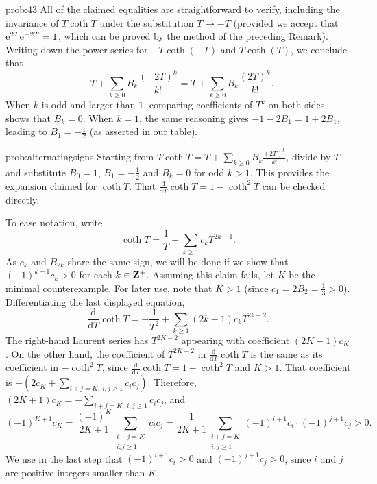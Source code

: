 \begin{sol}{prob:43} All of the claimed equalities are straightforward to verify, including the invariance of $T\coth{T}$ under the substitution $T\mapsto -T$ (provided we accept that $\mathrm{e}^{2T} \mathrm{e}^{-2T}=1$, which can be proved by the method of the preceding Remark). Writing down the power series for $-T\coth(-T)$ and $T\coth(T)$, we conclude that
\[ -T + \sum_{k\ge 0} B_k \frac{(-2T)^{k}}{k!} = T + \sum_{k\ge 0} B_k \frac{(2T)^{k}}{k!}. \]
When $k$ is odd and larger than $1$, comparing coefficients of $T^k$ on both sides shows that $B_k=0$. When $k=1$, the same reasoning gives $-1 -2B_1 = 1 + 2B_1$, leading to $B_1 = -\frac{1}{2}$ (as asserted in our table).

\begin{sol}{prob:alternatingsigns} Starting from $T\coth{T} = T + \sum_{k\ge 0} B_k \frac{(2T)^{k}}{k!}$, divide by $T$ and substitute $B_0=1$, $B_1=-\frac{1}{2}$ and $B_k=0$ for odd $k>1$. This provides the expansion claimed for $\coth{T}$. That $\frac{\mathrm{d}}{\mathrm{d}T}\coth{T} = 1-\coth^2{T}$ can be checked directly.

To ease notation, write \[ \coth{T} = \frac{1}{T} + \sum_{k\ge 1} c_k T^{2k-1}.\] As $c_k$ and $B_{2k}$ share the same sign, we will be done if we show that $(-1)^{k+1} c_k > 0$ for each $k \in \mathbf{Z}^{+}$. Assuming this claim fails, let $K$ be the minimal counterexample. For later use, note that $K > 1$ (since $c_1 = 2B_2 = \frac{1}{3} > 0$). Differentiating the last displayed equation,
\[ \frac{\mathrm{d}}{\mathrm{d}T}\coth{T} = -\frac{1}{T^2} + \sum_{k\ge 1} (2k-1) c_k T^{2k-2}. \]
The right-hand Laurent series has $T^{2K-2}$ appearing with coefficient $(2K-1) c_K$. On the other hand, the coefficient of $T^{2K-2}$ in $\frac{\mathrm{d}}{\mathrm{d}T}\coth{T}$ is the same as its coefficient in $-\coth^2{T}$, since $\frac{\mathrm{d}}{\mathrm{d}T}\coth{T} = 1 - \coth^2{T}$ and $K>1$. That coefficient is $-(2c_K+\sum_{i+j=K,~i,j\ge 1} c_i c_j)$.  Therefore,
$(2K+1) c_K = -\sum_{i+j=K,~i, j\ge 1} c_i c_j$, and
\[ (-1)^{K+1} c_K = \frac{(-1)^{K}}{2K+1} \sum_{\substack{i+j=K\\i, j\ge 1}} c_i c_j = \frac{1}{2K+1} \sum_{\substack{i+j=K\\i, j\ge 1}} (-1)^{i+1} c_i\cdot (-1)^{j+1} c_j > 0.\]
We use in the last step that $(-1)^{i+1}c_i > 0$ and $(-1)^{j+1} c_j > 0$, since $i$ and $j$ are positive integers smaller than $K$.
\end{sol}



\end{sol}
